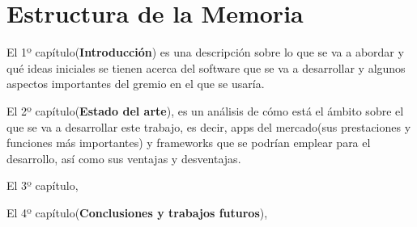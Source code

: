 \section{Estructura de la Memoria}

El 1º capítulo(\textbf{Introducción}) es una descripción sobre lo que se va a abordar y qué ideas iniciales se tienen acerca del software que se va a desarrollar y algunos aspectos importantes del gremio en el que se usaría.

El 2º capítulo(\textbf{Estado del arte}), es un análisis de cómo está el ámbito sobre el que se va a desarrollar este trabajo, es decir, apps del mercado(sus prestaciones y funciones más importantes) y frameworks que se podrían emplear para el desarrollo, así como sus ventajas y desventajas.  %

El 3º capítulo, %

El 4º capítulo(\textbf{Conclusiones y trabajos futuros}),